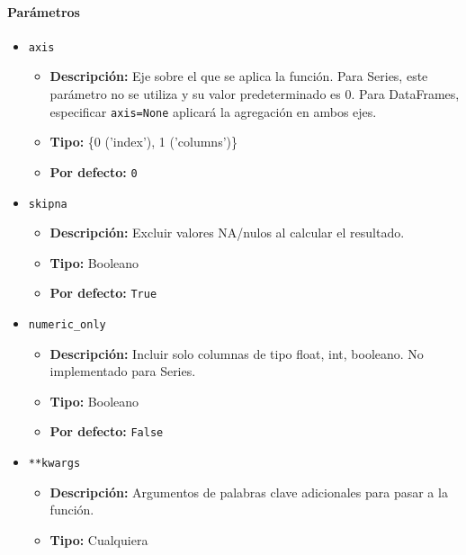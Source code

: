         \paragraph{\textbf{Parámetros}}
        \begin{itemize}
            \item \texttt{axis}
                \begin{itemize}
                    \item \textbf{Descripción:} Eje sobre el que se aplica la función. Para Series, este parámetro no se utiliza y su valor predeterminado es 0. Para DataFrames, especificar \texttt{axis=None} aplicará la agregación en ambos ejes.
                    \item \textbf{Tipo:} \{0 ('index'), 1 ('columns')\}
                    \item \textbf{Por defecto:} \texttt{0}
                \end{itemize}

            \item \texttt{skipna}
                \begin{itemize}
                    \item \textbf{Descripción:} Excluir valores NA/nulos al calcular el resultado.
                    \item \textbf{Tipo:} Booleano
                    \item \textbf{Por defecto:} \texttt{True}
                \end{itemize}

            \item \texttt{numeric\_only}
                \begin{itemize}
                    \item \textbf{Descripción:} Incluir solo columnas de tipo float, int, booleano. No implementado para Series.
                    \item \textbf{Tipo:} Booleano
                    \item \textbf{Por defecto:} \texttt{False}
                \end{itemize}

            \item \texttt{**kwargs}
                \begin{itemize}
                    \item \textbf{Descripción:} Argumentos de palabras clave adicionales para pasar a la función.
                    \item \textbf{Tipo:} Cualquiera
                \end{itemize}
        \end{itemize}

